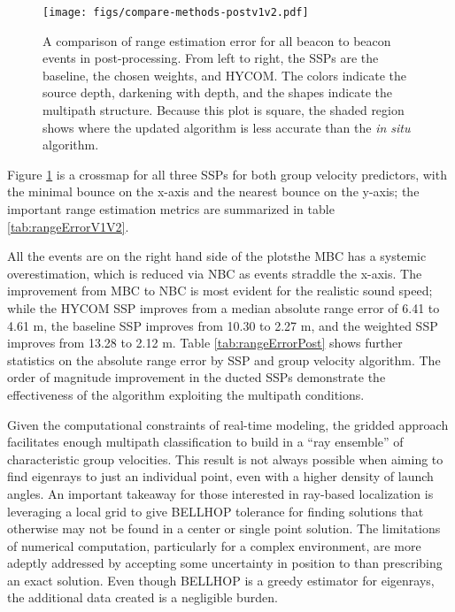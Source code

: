 \begin{figure}[h!]
\texttt{[image: figs/compare-methods-postv1v2.pdf]}
\caption{\label{fig:compareV1V2}{A comparison of range estimation error for all beacon to beacon events in post-processing. From left to right, the SSPs are the baseline, the chosen weights, and HYCOM. The colors indicate the source depth, darkening with depth, and the shapes indicate the multipath structure. Because this plot is square, the shaded region shows where the updated algorithm is less accurate than the \textit{in situ} algorithm.}}
\end{figure}

Figure \ref{fig:compareV1V2} is a crossmap for all three SSPs for both group velocity predictors, with the minimal bounce on the x-axis and the nearest bounce on the y-axis; the important range estimation metrics are summarized in table \ref{tab:rangeErrorV1V2}.

All the events are on the right hand side of the plots\textemdash the MBC has a systemic overestimation, which is reduced via NBC as events straddle the x-axis.
The improvement from MBC to NBC is most evident for the realistic sound speed; while the HYCOM SSP improves from a median absolute range error of 6.41 to 4.61 m, the baseline SSP improves from 10.30 to 2.27 m, and the weighted SSP improves from 13.28 to 2.12 m.
Table \ref{tab:rangeErrorPost} shows further statistics on the absolute range error by SSP and group velocity algorithm.
The order of magnitude improvement in the ducted SSPs demonstrate the effectiveness of the algorithm exploiting the multipath conditions.

Given the computational constraints of real-time modeling, the gridded approach facilitates enough multipath classification to build in a ``ray ensemble'' of characteristic group velocities.
This result is not always possible when aiming to find eigenrays to just an individual point, even with a higher density of launch angles.
An important takeaway for those interested in ray-based localization is leveraging a local grid to give BELLHOP tolerance for finding solutions that otherwise may not be found in a center or single point solution.
The limitations of numerical computation, particularly for a complex environment, are more adeptly addressed by accepting some uncertainty in position to than prescribing an exact solution.
Even though BELLHOP is a greedy estimator for eigenrays, the additional data created is a negligible burden. 

